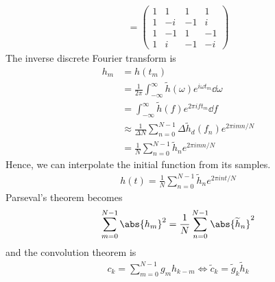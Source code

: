 \begin{align*}
	[\mathrm{DFT}] = \begin{pmatrix}
		1 & 1  & 1  & 1  \\
		1 & -i & -1 & i  \\
		1 & -1 & 1  & -1 \\
		1 & i  & -1 & -i
	\end{pmatrix}
\end{align*}
The inverse discrete Fourier transform is
\begin{align*}
	h_m & = h(t_m)                                                                                  \\
	    & = \frac{1}{2\pi} \int_{-\infty}^\infty \widetilde h(\omega) e^{i \omega t_m} \dd{\omega}  \\
	    & = \int_{-\infty}^\infty \widetilde h(f) e^{2\pi i f t_m} \dd{f}                           \\
	    & \approx \frac{1}{\Delta N} \sum_{n=0}^{N-1} \Delta \widetilde h_d(f_n) e^{2\pi i m n / N} \\
	    & = \frac{1}{N} \sum_{n=0}^{N-1} \widetilde h_n e^{2\pi i m n / N}
\end{align*}
Hence, we can interpolate the initial function from its samples.
\begin{align*}
	h(t) = \frac{1}{N} \sum_{n=0}^{N-1} \widetilde h_n e^{2\pi i n t / N}
\end{align*}
Parseval's theorem becomes
\begin{align*}
	\sum_{m=0}^{N-1} \abs{h_m}^2 = \frac{1}{N} \sum_{n=0}^{N-1} \abs{\widetilde h_n}^2
\end{align*}
and the convolution theorem is
\begin{align*}
	c_k = \sum_{m=0}^{N-1} g_m h_{k-m} \iff \widetilde c_k = \widetilde g_k \widetilde h_k
\end{align*}

